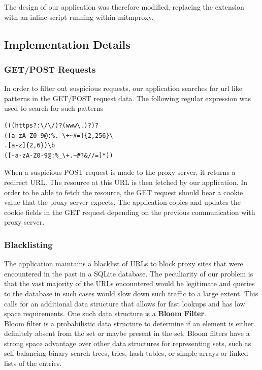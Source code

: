 \documentclass[a4paper,11pt,twocolumn]{article}
\begin{document}
The design of our application was therefore modified, replacing the extension with an inline script running within mitmproxy.

\subsection{Implementation Details}
\subsubsection{GET/POST Requests} \label{requests}
In order to filter out suspicious requests, our application searches for url like patterns in the GET/POST request data. The following regular expression was used to search for such patterns -
\begin{verbatim}
(((https?:\/\/)?(www\.)?)?
([a-zA-Z0-9@:%._\+~#=]{2,256}\
.[a-z]{2,6})\b
([-a-zA-Z0-9@:%_\+.~#?&//=]*))
\end{verbatim}

When a suspicious POST request is made to the proxy server, it returns a redirect URL. The resource at this URL is then fetched by our application. In order to be able to fetch the resource, the GET request should bear a cookie value that the proxy server expects. The application copies and updates the cookie fields in the GET request depending on the previous communication with proxy server.

\subsubsection{Blacklisting}
The application maintains a blacklist of URLs to block proxy sites that were encountered in the past in a SQLite database. The peculiarity of our problem is that the vast majority of the URLs encountered would be legitimate and queries to the database in such cases would slow down such traffic to a large extent. This calls for an additional data structure that allows for fast lookups and has low space requirements. One such data structure is a \textbf{Bloom Filter}.\\

Bloom filter is a probabilistic data structure to determine if an element is either definitely absent from the set or maybe present in the set. Bloom filters have a strong space advantage over other data structures for representing sets, such as self-balancing binary search trees, tries, hash tables, or simple arrays or linked lists of the entries.\\
\end{document}
